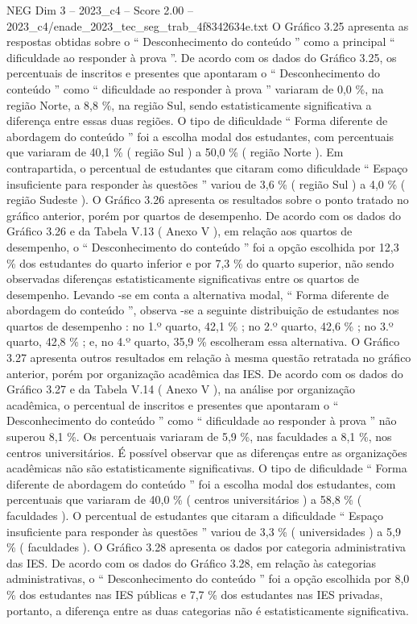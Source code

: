 \begin{textsample}{NEG Dim 3 – 2023\_c4 – Score 2.00 – 2023\_c4/enade\_2023\_tec\_seg\_trab\_4f8342634e.txt}
O Gráfico 3.25 apresenta as respostas obtidas sobre o “ Desconhecimento do conteúdo ” como a principal “ dificuldade ao responder à prova ”.
De acordo com os dados do Gráfico 3.25, os percentuais de inscritos e presentes que apontaram o “ Desconhecimento do conteúdo ” como “ dificuldade ao responder à prova ” variaram de 0,0 \%, na região Norte, a 8,8 \%, na região Sul, sendo estatisticamente significativa a diferença entre essas duas regiões.
O tipo de dificuldade “ Forma diferente de abordagem do conteúdo ” foi a escolha modal dos estudantes, com percentuais que variaram de 40,1 \% ( região Sul ) a 50,0 \% ( região Norte ).
Em contrapartida, o percentual de estudantes que citaram como dificuldade “ Espaço insuficiente para responder às questões ” variou de 3,6 \% ( região Sul ) a 4,0 \% ( região Sudeste ).
O Gráfico 3.26 apresenta os resultados sobre o ponto tratado no gráfico anterior, porém por quartos de desempenho.
De acordo com os dados do Gráfico 3.26 e da Tabela V.13 ( Anexo V ), em relação aos quartos de desempenho, o “ Desconhecimento do conteúdo ” foi a opção escolhida por 12,3 \% dos estudantes do quarto inferior e por 7,3 \% do quarto superior, não sendo observadas diferenças estatisticamente significativas entre os quartos de desempenho.
Levando -se em conta a alternativa modal, “ Forma diferente de abordagem do conteúdo ”, observa -se a seguinte distribuição de estudantes nos quartos de desempenho : no 1.º quarto, 42,1 \% ; no 2.º quarto, 42,6 \% ; no 3.º quarto, 42,8 \% ; e, no 4.º quarto, 35,9 \% escolheram essa alternativa.
O Gráfico 3.27 apresenta outros resultados em relação à mesma questão retratada no gráfico anterior, porém por organização acadêmica das IES.
De acordo com os dados do Gráfico 3.27 e da Tabela V.14 ( Anexo V ), na análise por organização acadêmica, o percentual de inscritos e presentes que apontaram o “ Desconhecimento do conteúdo ” como “ dificuldade ao responder à prova ” não superou 8,1 \%.
Os percentuais variaram de 5,9 \%, nas faculdades a 8,1 \%, nos centros universitários.
É possível observar que as diferenças entre as organizações acadêmicas não são estatisticamente significativas.
O tipo de dificuldade “ Forma diferente de abordagem do conteúdo ” foi a escolha modal dos estudantes, com percentuais que variaram de 40,0 \% ( centros universitários ) a 58,8 \% ( faculdades ).
O percentual de estudantes que citaram a dificuldade “ Espaço insuficiente para responder às questões ” variou de 3,3 \% ( universidades ) a 5,9 \% ( faculdades ).
O Gráfico 3.28 apresenta os dados por categoria administrativa das IES.
De acordo com os dados do Gráfico 3.28, em relação às categorias administrativas, o “ Desconhecimento do conteúdo ” foi a opção escolhida por 8,0 \% dos estudantes nas IES públicas e 7,7 \% dos estudantes nas IES privadas, portanto, a diferença entre as duas categorias não é estatisticamente significativa.

\end{textsample}

